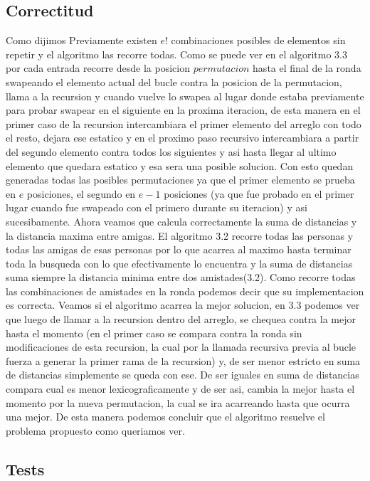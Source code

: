 \subsection{Correctitud}
Como dijimos Previamente existen $e!$ combinaciones posibles de elementos sin repetir y el algoritmo las recorre todas. Como se puede ver en el algoritmo 3.3 por cada entrada recorre desde la posicion $permutacion$ hasta el final de la ronda swapeando el elemento actual del bucle contra la posicion de la permutacion, llama a la recursion y cuando vuelve lo swapea al lugar donde estaba previamente para probar swapear en el siguiente en la proxima iteracion, de esta manera en el primer caso de la recursion intercambiara el primer elemento del arreglo con todo el resto, dejara ese estatico y en el proximo paso recursivo intercambiara a partir del segundo elemento contra todos los siguientes y asi hasta llegar al ultimo elemento que quedara estatico y esa sera una posible solucion. Con esto quedan generadas todas las posibles permutaciones ya que el primer elemento se prueba en $e$ posiciones, el segundo en $e-1$ posiciones (ya que fue probado en el primer lugar cuando fue swapeado con el primero durante su iteracion) y asi sucesibamente.  \newline
Ahora veamos que calcula correctamente la suma de distancias y la distancia maxima entre amigas. El algoritmo 3.2 recorre todas las personas y todas las amigas de esas personas por lo que acarrea al maximo hasta terminar toda la busqueda con lo que efectivamente lo encuentra y la suma de distancias suma siempre la distancia minima entre dos amistades(3.2). Como recorre todas las combinaciones de amistades en la ronda podemos decir que su implementacion es correcta.
\newline
Veamos si el algoritmo acarrea la mejor solucion, en 3.3 podemos ver que luego de llamar a la recursion dentro del arreglo, se chequea contra la mejor hasta el momento (en el primer caso se compara contra la ronda sin modificaciones de esta recursion, la cual por la llamada recursiva previa al bucle fuerza a generar la primer rama de la recursion) y, de ser menor estricto en suma de distancias simplemente se queda con ese.
De ser iguales en suma de distancias compara cual es menor lexicograficamente y de ser asi, cambia la mejor hasta el momento por la nueva permutacion, la cual se ira acarreando hasta que ocurra una mejor.
De esta manera podemos concluir que el algoritmo resuelve el problema propuesto como queriamos ver.

\subsection{Tests}

